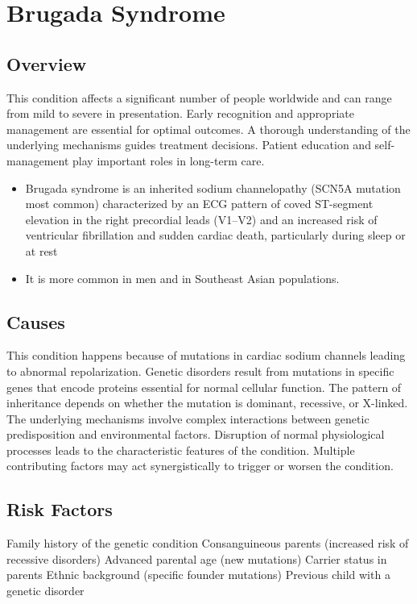 \chapter{Brugada Syndrome}
\label{sec:Brugada Syndrome}

\section{Overview}
This condition affects a significant number of people worldwide and can range from mild to severe in presentation. Early recognition and appropriate management are essential for optimal outcomes. A thorough understanding of the underlying mechanisms guides treatment decisions. Patient education and self-management play important roles in long-term care.

\begin{itemize}[noitemsep]
  \item Brugada syndrome is an inherited sodium channelopathy (SCN5A mutation most common) characterized by an ECG pattern of coved ST-segment elevation in the right precordial leads (V1--V2) and an increased risk of ventricular fibrillation and sudden cardiac death, particularly during sleep or at rest
  \item It is more common in men and in Southeast Asian populations.
\end{itemize}
\section{Causes}
This condition happens because of mutations in cardiac sodium channels leading to abnormal repolarization. Genetic disorders result from mutations in specific genes that encode proteins essential for normal cellular function. The pattern of inheritance depends on whether the mutation is dominant, recessive, or X-linked. The underlying mechanisms involve complex interactions between genetic predisposition and environmental factors. Disruption of normal physiological processes leads to the characteristic features of the condition. Multiple contributing factors may act synergistically to trigger or worsen the condition.
\section{Risk Factors}
Family history of the genetic condition Consanguineous parents (increased risk of recessive disorders) Advanced parental age (new mutations) Carrier status in parents Ethnic background (specific founder mutations) Previous child with a genetic disorder

